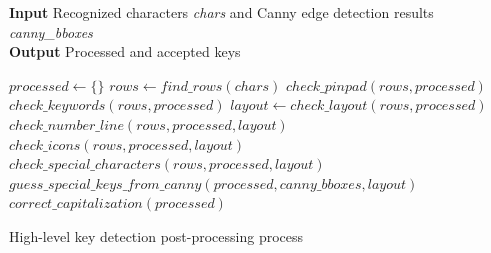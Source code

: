 \begin{algorithm}
    \hspace*{\algorithmicindent} \textbf{Input} Recognized characters \emph{chars} and Canny edge detection results \emph{canny\_bboxes} \\
    \hspace*{\algorithmicindent} \textbf{Output} Processed and accepted keys
    \begin{algorithmic}[1]
    \STATE $processed\gets \{\}$
    \STATE $rows\gets find\_rows(chars)$
    \STATE $check\_pinpad(rows, processed)$
    \STATE $check\_keywords(rows, processed)$
    \STATE $layout\gets check\_layout(rows, processed)$
    \STATE $check\_number\_line(rows, processed, layout)$
    \STATE $check\_icons(rows, processed, layout)$
    \STATE $check\_special\_characters(rows, processed, layout)$
    \STATE $guess\_special\_keys\_from\_canny(processed, canny\_bboxes, layout)$
    \STATE $correct\_capitalization(processed)$
    \end{algorithmic}
    \caption{High-level key detection post-processing process}
    \label{postprocessing-algorithm}
\end{algorithm}

